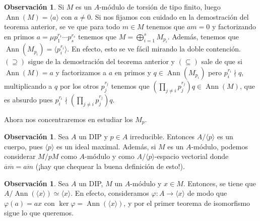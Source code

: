 \documentclass[12pt]{book}
\theoremstyle{definition}
\newtheorem{obs}[teo]{Observación}
\DeclareMathOperator{\ann}{Ann}
\begin{document}
\begin{obs}
Si $M$ es un $A$-módulo de torsión de tipo finito, luego $\ann(M)=\langle a\rangle$ con $a\neq 0$. Si nos fijamos con cuidado en la demostración del teorema anterior, se ve que para todo $m\in M$ tenemos que $am=0$ y factorizando en primos $a=\mu p_1^{r_1}\cdots p_s^{r_s}$ tenemos que $M=\displaystyle\bigoplus_{i=1}^s M_{p_i}$. Además, tenemos que $\ann(M_{p_i}) = \langle p_i^{r_i}\rangle$. En efecto, esto se ve fácil mirando la doble contención. $(\supseteq)$ sigue de la demostración del teorema anterior y $(\subseteq)$ sale de que si $\ann(M)=a$ y factorizamos a $a$ en primos y $q\in\ann(M_{p_i})$ pero $p_i^{r_i}\nmid q$, multiplicando a $q$ por los otros $p_j^{r_j}$ tenemos que $\left(\displaystyle\prod_{j\neq i}p_j^{r_j}\right)q \in\ann(M)$, que es absurdo pues $p_i^{r_i}\nmid\left(\displaystyle\prod_{j\neq i}p_j^{r_j}\right)q$.
\end{obs}

Ahora nos concentraremos en estudiar los $M_p$.

\begin{obs}
Sea $A$ un DIP y $p\in A$ irreducible. Entonces $A/\langle p\rangle$ es un cuerpo, pues $\langle p\rangle$ es un ideal maximal. Además, si $M$ es un $A$-módulo, podemos considerar $M/pM$ como $A$-módulo y como $A/\langle p\rangle$-espacio vectorial donde $\overline{a}\overline{m} = \overline{am}$ (¡hay que chequear la buena definición de esto!).
\end{obs}
\begin{obs}
Sea $A$ un DIP, $M$ un $A$-módulo y $x\in M$. Entonces, se tiene que $A/\ann(\langle x\rangle)\simeq\langle x\rangle$. En efecto, consideramos $\varphi:A\to \langle x\rangle$ de modo que $\varphi(a)=ax$ con $\ker \varphi = \ann(\langle x\rangle)$, y por el primer teorema de isomorfismo sigue lo que queremos.
\end{obs}
\end{document}
